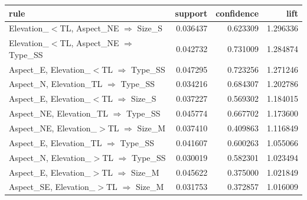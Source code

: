 \begin{tabular}{lrrr}
\toprule
rule & support & confidence & lift \\
\midrule
Elevation\_$<$TL, Aspect\_NE $\Rightarrow$ Size\_S & 0.036437 & 0.623309 & 1.296336 \\
Elevation\_$<$TL, Aspect\_NE $\Rightarrow$ Type\_SS & 0.042732 & 0.731009 & 1.284874 \\
Aspect\_E, Elevation\_$<$TL $\Rightarrow$ Type\_SS & 0.047295 & 0.723256 & 1.271246 \\
Aspect\_N, Elevation\_TL $\Rightarrow$ Type\_SS & 0.034216 & 0.684307 & 1.202786 \\
Aspect\_E, Elevation\_$<$TL $\Rightarrow$ Size\_S & 0.037227 & 0.569302 & 1.184015 \\
Aspect\_NE, Elevation\_TL $\Rightarrow$ Type\_SS & 0.045774 & 0.667702 & 1.173600 \\
Aspect\_NE, Elevation\_$>$TL $\Rightarrow$ Size\_M & 0.037410 & 0.409863 & 1.116849 \\
Aspect\_E, Elevation\_TL $\Rightarrow$ Type\_SS & 0.041607 & 0.600263 & 1.055066 \\
Aspect\_N, Elevation\_$>$TL $\Rightarrow$ Type\_SS & 0.030019 & 0.582301 & 1.023494 \\
Aspect\_E, Elevation\_$>$TL $\Rightarrow$ Size\_M & 0.045622 & 0.375000 & 1.021849 \\
Aspect\_SE, Elevation\_$>$TL $\Rightarrow$ Size\_M & 0.031753 & 0.372857 & 1.016009 \\
\bottomrule
\end{tabular}

